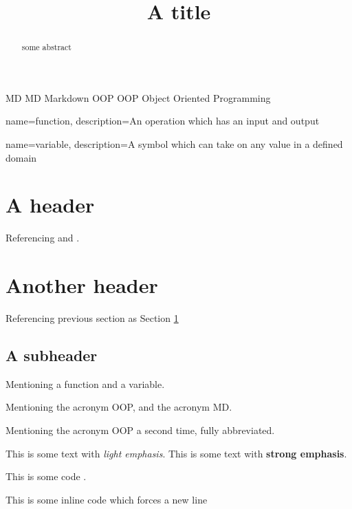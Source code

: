 \documentclass[a4paper, ]{article}
\title{A title}
\begin{document}
    \maketitle
    
    \begin{abstract}
    some abstract
    \end{abstract}
    \clearpage

    \tableofcontents
    \clearpage
    
    \newacronym
        {MD}
        {MD}
        {Markdown}
    \newacronym
        {OOP}
        {OOP}
        {Object Oriented Programming}

    {
        name=function,
        description={An operation which has an input and output}
    }

    {
        name=variable,
        description={A symbol which can take on any value in a defined domain}
    }

    \section{A header}
    \label{sec:my-header}

    Referencing \cite{an-online-resource} and
    \cite{another-online-resource}.

    \section{Another header}
    \label{another-header}

    Referencing previous section as Section \ref{sec:my-header}

    \subsection{A subheader}
    \label{a-subheader}

    Mentioning a \gls{function} and a \gls{variable}.

    Mentioning the acronym \gls{OOP}, and the acronym \gls{MD}.

    Mentioning the acronym \gls{OOP} a second time, fully abbreviated.

    This is some text with \textit{light emphasis}. This is some text
    with \textbf{strong emphasis}.

    This is some code .

    This is some inline code which forces a new line
\end{document}
